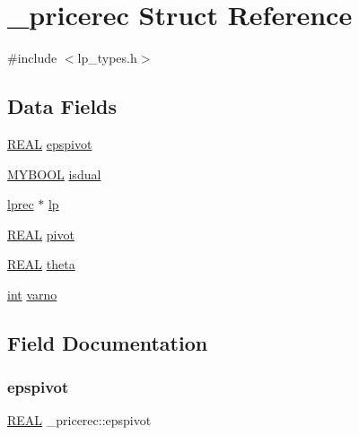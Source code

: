 \hypertarget{struct__pricerec}{}\section{\+\_\+pricerec Struct Reference}
\label{struct__pricerec}


{\ttfamily \#include $<$lp\+\_\+types.\+h$>$}

\subsection*{Data Fields}
\begin{DoxyCompactItemize}
\item 
\hyperlink{lp__lib_8h_a92bd5e363d131fa73669358edb232dce}{R\+E\+AL} \hyperlink{struct__pricerec_aaca25c8f9838f34dc7a41754ee36a2e1}{epspivot}
\item 
\hyperlink{lp__lib_8h_aad848328fb3018217ac9f01d97b6bd88}{M\+Y\+B\+O\+OL} \hyperlink{struct__pricerec_a3ebb3f3e4c89ce4d90a9a3f9d4b514c6}{isdual}
\item 
\hyperlink{lp__types_8h_afe42f1373b9ee8d824b5cad6a22d24c6}{lprec} $\ast$ \hyperlink{struct__pricerec_a26cd2529023b3713e84154fdbc2cdd6a}{lp}
\item 
\hyperlink{lp__lib_8h_a92bd5e363d131fa73669358edb232dce}{R\+E\+AL} \hyperlink{struct__pricerec_a2a7b29d997506a1f1b00264e2aa9d209}{pivot}
\item 
\hyperlink{lp__lib_8h_a92bd5e363d131fa73669358edb232dce}{R\+E\+AL} \hyperlink{struct__pricerec_aaa30bfbde8c7aa8d9564594af0173315}{theta}
\item 
\hyperlink{lp__lib_8h_adeb9ec6400320e4923ac9d836d509ddb}{int} \hyperlink{struct__pricerec_a73e4fd44e1cf3d74d1fbdfcf660a3f59}{varno}
\end{DoxyCompactItemize}


\subsection{Field Documentation}
\mbox{\label{struct__pricerec_aaca25c8f9838f34dc7a41754ee36a2e1}} 
\subsubsection{\texorpdfstring{epspivot}{epspivot}}
{\footnotesize\ttfamily \hyperlink{lp__lib_8h_a92bd5e363d131fa73669358edb232dce}{R\+E\+AL} \+\_\+pricerec\+::epspivot}

